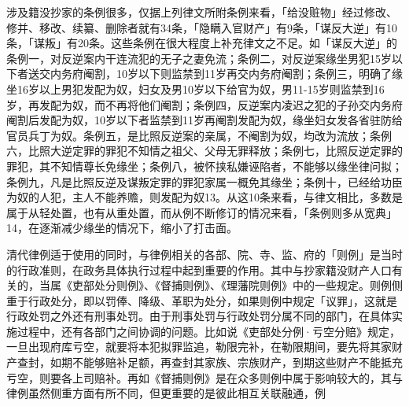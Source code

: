\vfill
\begin{BookNotes}
\end{BookNotes}

涉及籍没抄家的条例很多，仅据上列律文所附条例来看，「给没赃物」经过修改、修并、移改、续纂、删除者就有34条，「隐瞒入官财产」有9条，「谋反大逆」有10条，「谋叛」有20条。这些条例在很大程度上补充律文之不足。如「谋反大逆」的条例一，对反逆案内干连流犯的无子之妻免流；条例二，对反逆案缘坐男犯15岁以下者送交内务府阉割，10岁以下则监禁到11岁再交内务府阉割；条例三，明确了缘坐16岁以上男犯发配为奴，妇女及男10岁以下给官为奴，男11-15岁则监禁到16岁，再发配为奴，而不再将他们阉割；条例四，反逆案内凌迟之犯的子孙交内务府阉割后发配为奴，10岁以下者监禁到11岁再阉割发配为奴，缘坐妇女发各省驻防给官员兵丁为奴。条例五，是比照反逆案的亲属，不阉割为奴，均改为流放；条例六，比照大逆定罪的罪犯不知情之祖父、父母无罪释放；条例七，比照反逆定罪的罪犯，其不知情尊长免缘坐；条例八，被怀挟私嫌诬陷者，不能够以缘坐律问拟；条例九，凡是比照反逆及谋叛定罪的罪犯家属一概免其缘坐；条例十，已经给功臣为奴的人犯，主人不能养赡，则发配为奴13。从这10条来看，与律文相比，多数是属于从轻处置，也有从重处置，而从例不断修订的情况来看，「条例则多从宽典」14，在逐渐减少缘坐的情况下，缩小了打击面。

清代律例适于使用的同时，与律例相关的各部、院、寺、监、府的「则例」是当时的行政准则，在政务具体执行过程中起到重要的作用。其中与抄家籍没财产人口有关的，当属《吏部处分则例》、《督捕则例》、《理藩院则例》中的一些规定。则例侧重于行政处分，即以罚俸、降级、革职为处分，如果则例中规定「议罪」，这就是行政处罚之外还有刑事处罚。由于刑事处罚与行政处罚分属不同的部门，在具体实施过程中，还有各部门之间协调的问题。比如说《吏部处分例·亏空分赔》规定，一旦出现府库亏空，就要将本犯拟罪监追，勒限完补，在勒限期间，要先将其家财产查封，如期不能够赔补足额，再查封其家族、宗族财产，到期这些财产不能抵充亏空，则要各上司赔补。再如《督捕则例》是在众多则例中属于影响较大的，其与律例虽然侧重方面有所不同，但更重要的是彼此相互关联融通，例

